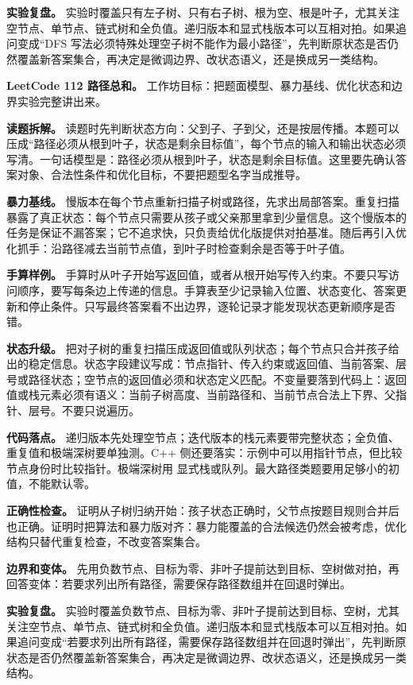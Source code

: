 \textbf{实验复盘。} 实验时覆盖只有左子树、只有右子树、根为空、根是叶子，尤其关注空节点、单节点、链式树和全负值。递归版本和显式栈版本可以互相对拍。如果追问变成“DFS 写法必须特殊处理空子树不能作为最小路径”，先判断原状态是否仍然覆盖新答案集合，再决定是微调边界、改状态语义，还是换成另一类结构。

\noindent\textbf{LeetCode 112 路径总和。} 工作坊目标：把题面模型、暴力基线、优化状态和边界实验完整讲出来。

\textbf{读题拆解。} 读题时先判断状态方向：父到子、子到父，还是按层传播。本题可以压成“路径必须从根到叶子，状态是剩余目标值”，每个节点的输入和输出状态必须写清。一句话模型是：路径必须从根到叶子，状态是剩余目标值。这里要先确认答案对象、合法性条件和优化目标，不要把题型名字当成推导。

\textbf{暴力基线。} 慢版本在每个节点重新扫描子树或路径，先求出局部答案。重复扫描暴露了真正状态：每个节点只需要从孩子或父亲那里拿到少量信息。这个慢版本的任务是保证不漏答案；它不追求快，只负责给优化版提供对拍基准。随后再引入优化抓手：沿路径减去当前节点值，到叶子时检查剩余是否等于叶子值。

\textbf{手算样例。} 手算时从叶子开始写返回值，或者从根开始写传入约束。不要只写访问顺序，要写每条边上传递的信息。手算表至少记录输入位置、状态变化、答案更新和停止条件。只写最终答案看不出边界，逐轮记录才能发现状态更新顺序是否错。

\textbf{状态升级。} 把对子树的重复扫描压成返回值或队列状态；每个节点只合并孩子给出的稳定信息。状态字段建议写成：节点指针、传入约束或返回值、当前答案、层号或路径状态；空节点的返回值必须和状态定义匹配。不变量要落到代码上：返回值或栈元素必须有语义：当前子树高度、当前路径和、当前节点合法上下界、父指针、层号。不要只说遍历。

\textbf{代码落点。} 递归版本先处理空节点；迭代版本的栈元素要带完整状态；全负值、重复值和极端深树要单独测。C++ 侧还要落实：示例中可以用指针节点，但比较节点身份时比较指针。极端深树用  显式栈或队列。最大路径类题要用足够小的初值，不能默认零。

\textbf{正确性检查。} 证明从子树归纳开始：孩子状态正确时，父节点按题目规则合并后也正确。证明时把算法和暴力版对齐：暴力能覆盖的合法候选仍然会被考虑，优化结构只替代重复检查，不改变答案集合。

\textbf{边界和变体。} 先用负数节点、目标为零、非叶子提前达到目标、空树做对拍，再回答变体：若要求列出所有路径，需要保存路径数组并在回退时弹出。

\textbf{实验复盘。} 实验时覆盖负数节点、目标为零、非叶子提前达到目标、空树，尤其关注空节点、单节点、链式树和全负值。递归版本和显式栈版本可以互相对拍。如果追问变成“若要求列出所有路径，需要保存路径数组并在回退时弹出”，先判断原状态是否仍然覆盖新答案集合，再决定是微调边界、改状态语义，还是换成另一类结构。

